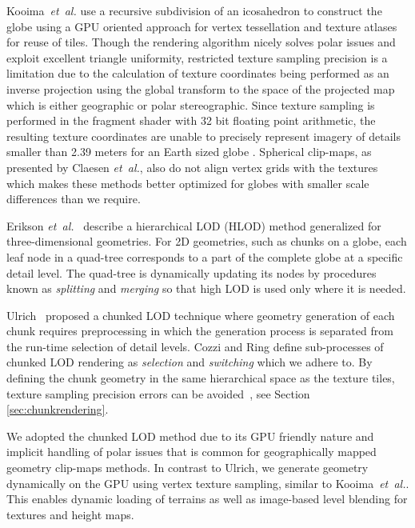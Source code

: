 \documentclass[journal]{vgtc}                %
\newcommand{\etal}{\emph{et~al.}}
\begin{document}
Kooima~\etal\cite{kooima2009planetary} use a recursive subdivision of an icosahedron to construct the globe using a GPU oriented approach for vertex tessellation and texture atlases for reuse of tiles. Though the rendering algorithm nicely solves polar issues and exploit excellent triangle uniformity, restricted texture sampling precision is a limitation due to the calculation of texture coordinates being performed as an inverse projection using the global transform to the space of the projected map which is either geographic or polar stereographic. Since texture sampling is performed in the fragment shader with 32 bit floating point arithmetic, the resulting texture coordinates are unable to precisely represent imagery of details smaller than 2.39 meters for an Earth sized globe \cite{kooima2009planetary}.
Spherical clip-maps, as presented by Claesen \etal \cite{clasen2006terrain}, also do not align vertex grids with the textures which makes these methods better optimized for globes with smaller scale differences than we require.

Erikson \etal~\cite{Erikson:2001:HFD:364338.364376} describe a hierarchical LOD (HLOD) method generalized for three-dimensional geometries. For 2D geometries, such as chunks on a globe, each leaf node in a quad-tree corresponds to a part of the complete globe at a specific detail level.
The quad-tree is dynamically updating its nodes by procedures known as \emph{splitting} and \emph{merging} so that high LOD is used only where it is needed.

Ulrich~\cite{ulrich2002rendering} proposed a chunked LOD technique where geometry generation of each chunk requires preprocessing in which the generation process is separated from the run-time selection of detail levels. Cozzi and Ring \cite{cozzi20113d} define sub-processes of chunked LOD rendering as \emph{selection} and \emph{switching} which we adhere to. By defining the chunk geometry in the same hierarchical space as the texture tiles, texture sampling precision errors can be avoided~\cite{cozzi20113d}, see Section \ref{sec:chunkrendering}.


We adopted the chunked LOD method due to its GPU friendly nature and implicit handling of polar issues that is common for geographically mapped geometry clip-maps methods. In contrast to Ulrich, we generate geometry dynamically on the GPU using vertex texture sampling, similar to Kooima~\etal\cite{kooima2009planetary}. This enables dynamic loading of terrains as well as image-based level blending for textures and height maps.
\end{document}
